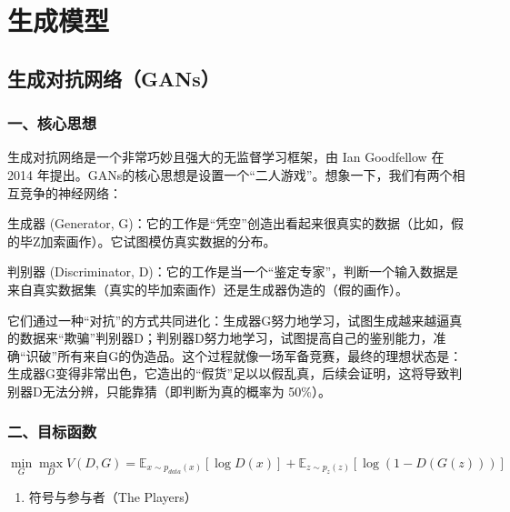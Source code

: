 \hypertarget{ux751fux6210ux6a21ux578b}{%
\chapter{生成模型}\label{ux751fux6210ux6a21ux578b}}

\hypertarget{ux751fux6210ux5bf9ux6297ux7f51ux7edcgans}{%
\section{生成对抗网络（GANs）}\label{ux751fux6210ux5bf9ux6297ux7f51ux7edcgans}}

\hypertarget{ux4e00ux6838ux5fc3ux601dux60f3-2}{%
\subsection{一、核心思想}\label{ux4e00ux6838ux5fc3ux601dux60f3-2}}

生成对抗网络是一个非常巧妙且强大的无监督学习框架，由 Ian Goodfellow 在 2014 年提出。GANs的核心思想是设置一个``二人游戏''。想象一下，我们有两个相互竞争的神经网络：

生成器 (Generator, G)：它的工作是``凭空''创造出看起来很真实的数据（比如，假的毕Z加索画作）。它试图模仿真实数据的分布。

判别器 (Discriminator, D)：它的工作是当一个``鉴定专家''，判断一个输入数据是来自真实数据集（真实的毕加索画作）还是生成器伪造的（假的画作）。

它们通过一种``对抗''的方式共同进化：生成器G努力地学习，试图生成越来越逼真的数据来``欺骗''判别器D；判别器D努力地学习，试图提高自己的鉴别能力，准确``识破''所有来自G的伪造品。这个过程就像一场军备竞赛，最终的理想状态是：生成器G变得非常出色，它造出的``假货''足以以假乱真，后续会证明，这将导致判别器D无法分辨，只能靠猜（即判断为真的概率为 50\%）。

\hypertarget{ux4e8cux76eeux6807ux51fdux6570}{%
\subsection{二、目标函数}\label{ux4e8cux76eeux6807ux51fdux6570}}

\[
\min_G \max_D V(D, G)=\mathbb{E}_{x\sim p_{data}(x)}[\log D(x)] + \mathbb{E}_{z\sim p_z(z)}[\log(1 - D(G(z)))]
\]

\begin{enumerate}
\def\labelenumi{\arabic{enumi}.}
\tightlist
\item
  符号与参与者（The Players）
\end{enumerate}

